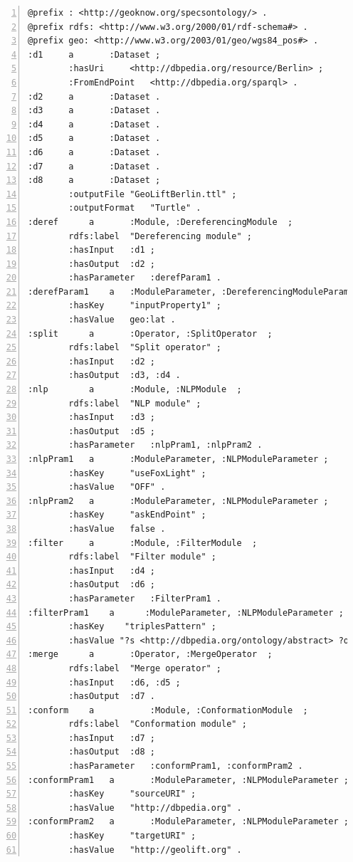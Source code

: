 \documentclass[a4paper,twoside,bibtotoc,abstracton,12pt,BCOR=15mm]{article}
\begin{document}
    
\begin{lstlisting}[label=lst:rdfconf, numbers=left, numberstyle=\tiny, caption = Example of RDF configuration file.]
@prefix : <http://geoknow.org/specsontology/> .
@prefix rdfs: <http://www.w3.org/2000/01/rdf-schema#> .
@prefix geo: <http://www.w3.org/2003/01/geo/wgs84_pos#> .
:d1		a		:Dataset ;
		:hasUri		<http://dbpedia.org/resource/Berlin> ;
		:FromEndPoint	<http://dbpedia.org/sparql> .
:d2		a		:Dataset .
:d3		a		:Dataset .
:d4		a		:Dataset .
:d5		a		:Dataset .
:d6		a		:Dataset .
:d7		a		:Dataset .
:d8		a		:Dataset ;
		:outputFile	"GeoLiftBerlin.ttl" ;
		:outputFormat	"Turtle" .
:deref		a		:Module, :DereferencingModule  ;
		rdfs:label	"Dereferencing module" ;
		:hasInput	:d1 ;
		:hasOutput	:d2 ;
		:hasParameter	:derefParam1 .
:derefParam1	a   :ModuleParameter, :DereferencingModuleParameter ;
		:hasKey		"inputProperty1" ;
		:hasValue	geo:lat .
:split		a		:Operator, :SplitOperator  ;
		rdfs:label	"Split operator" ;
		:hasInput	:d2 ;
		:hasOutput	:d3, :d4 .
:nlp		a		:Module, :NLPModule  ;
		rdfs:label	"NLP module" ;
		:hasInput	:d3 ;
		:hasOutput	:d5 ;
		:hasParameter	:nlpPram1, :nlpPram2 .
:nlpPram1	a		:ModuleParameter, :NLPModuleParameter ;
		:hasKey		"useFoxLight" ;
		:hasValue	"OFF" .
:nlpPram2 	a		:ModuleParameter, :NLPModuleParameter ;
		:hasKey		"askEndPoint" ;
		:hasValue	false .
:filter		a		:Module, :FilterModule  ;
		rdfs:label	"Filter module" ;
		:hasInput	:d4 ;
		:hasOutput	:d6 ;
		:hasParameter	:FilterPram1 .
:filterPram1	a      :ModuleParameter, :NLPModuleParameter ;
	    :hasKey    "triplesPattern" ;
	    :hasValue "?s <http://dbpedia.org/ontology/abstract> ?o".
:merge		a		:Operator, :MergeOperator  ;
		rdfs:label	"Merge operator" ;
		:hasInput	:d6, :d5 ;
		:hasOutput	:d7 .
:conform	a			:Module, :ConformationModule  ;
		rdfs:label	"Conformation module" ;
		:hasInput	:d7 ;
		:hasOutput	:d8 ;
		:hasParameter	:conformPram1, :conformPram2 .
:conformPram1	a		:ModuleParameter, :NLPModuleParameter ;
		:hasKey		"sourceURI" ;
		:hasValue	"http://dbpedia.org" .
:conformPram2	a		:ModuleParameter, :NLPModuleParameter ;
		:hasKey		"targetURI" ;
		:hasValue	"http://geolift.org" .
\end{lstlisting}
\end{document}
